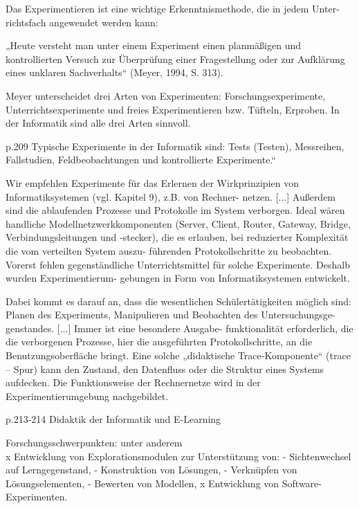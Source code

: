Das Experimentieren ist eine wichtige Erkenntnismethode, die in jedem Unter-
richtsfach angewendet werden kann:  

„Heute  versteht  man  unter  einem  Experiment  einen  planmäßigen  und  kontrollierten 
Versuch  zur  Überprüfung  einer  Fragestellung  oder  zur  Aufklärung  eines  unklaren 
Sachverhalts“ (Meyer, 1994, S. 313). 

Meyer  unterscheidet  drei  Arten  von  Experimenten:  Forschungsexperimente, 
Unterrichtsexperimente und freies Experimentieren bzw. Tüfteln, Erproben. In 
der Informatik sind alle drei Arten sinnvoll. 

p.209
  Typische  Experimente  in  der  Informatik  sind:  Tests  (Testen), 
Messreihen,  Fallstudien,  Feldbeobachtungen  und  kontrollierte  Experimente.“ 

 Wir empfehlen Experimente für das Erlernen 
der Wirkprinzipien von Informatiksystemen (vgl. Kapitel 9), z.B. von Rechner-
netzen. [...]
Außerdem sind die ablaufenden Prozesse und Protokolle 
im  System  verborgen.  Ideal  wären  handliche  Modellnetzwerkkomponenten 
(Server, Client, Router, Gateway, Bridge, Verbindungsleitungen und -stecker), 
die es erlauben, bei reduzierter Komplexität die vom verteilten System auszu-
führenden  Protokollschritte  zu  beobachten.  Vorerst  fehlen  gegenständliche 
Unterrichtsmittel für solche Experimente. Deshalb wurden Experimentierum-
gebungen in Form von Informatiksystemen entwickelt.  

Dabei  kommt  es  darauf  an,  dass  die  wesentlichen  Schülertätigkeiten  möglich 
sind: Planen des Experiments, Manipulieren und Beobachten des Untersuchungsge-
genstandes.  [...]  Immer  ist  eine  besondere  Ausgabe-
funktionalität erforderlich, die die verborgenen Prozesse, hier die ausgeführten 
Protokollschritte, an die Benutzungsoberfläche bringt. Eine solche „didaktische 
Trace-Komponente“ (trace – Spur) kann den Zustand, den Datenfluss oder die 
Struktur eines Systems aufdecken. Die Funktionsweise der Rechnernetze wird 
in der Experimentierumgebung nachgebildet.

p.213-214
Didaktik der Informatik und E-Learning 

Forschungsschwerpunkten: unter anderem\\
x Entwicklung von Explorationsmodulen zur Unterstützung von: 
- Sichtenwechsel auf Lerngegenstand, 
- Konstruktion von Lösungen, 
- Verknüpfen von Lösungselementen, 
- Bewerten von Modellen, 
x Entwicklung von Software-Experimenten. 

